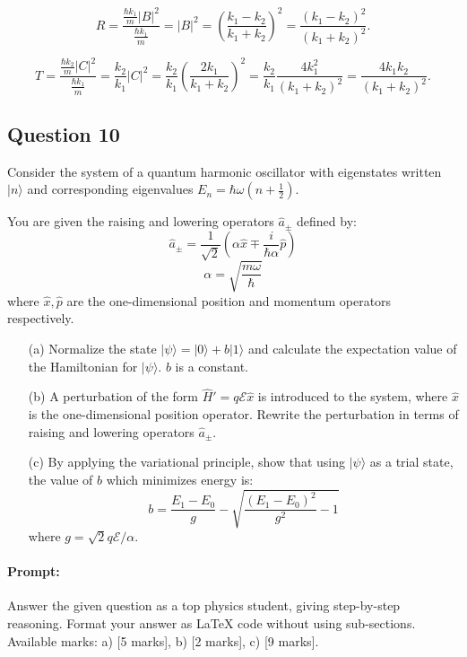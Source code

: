 \documentclass{article}
\begin{document}
\[
R = \frac{\frac{\hbar k_1}{m}|B|^2}{\frac{\hbar k_1}{m}} = |B|^2 = \left(\frac{k_1 - k_2}{k_1 + k_2}\right)^2 = \frac{(k_1 - k_2)^2}{(k_1 + k_2)^2}.
\]

\[
T = \frac{\frac{\hbar k_2}{m}|C|^2}{\frac{\hbar k_1}{m}} = \frac{k_2}{k_1}|C|^2 = \frac{k_2}{k_1}\left(\frac{2k_1}{k_1 + k_2}\right)^2 = \frac{k_2}{k_1}\frac{4k_1^2}{(k_1 + k_2)^2} = \frac{4k_1k_2}{(k_1 + k_2)^2}.
\]

\subsection{Question 10}

Consider the system of a quantum harmonic oscillator with eigenstates written \(|n\rangle\) and corresponding eigenvalues \(E_n = \hbar\omega(n + \frac{1}{2})\). 

You are given the raising and lowering operators \(\hat{a}_\pm\) defined by:
\[
\hat{a}_\pm = \frac{1}{\sqrt{2}} \left(\alpha \hat{x} \mp \frac{i}{\hbar \alpha} \hat{p}\right)
\]
\[
\alpha = \sqrt{\frac{m\omega}{\hbar}}
\]
where \(\hat{x}, \hat{p}\) are the one-dimensional position and momentum operators respectively.

\begin{enumerate}
    \item[(a)] Normalize the state \(|\psi\rangle = |0\rangle + b |1\rangle\) and calculate the expectation value of the Hamiltonian for \(|\psi\rangle\). \(b\) is a constant.
    
    \item[(b)] A perturbation of the form \(\hat{H}' = q \mathcal{E} \hat{x}\) is introduced to the system, where \(\hat{x}\) is the one-dimensional position operator. Rewrite the perturbation in terms of raising and lowering operators \(\hat{a}_\pm\).
    
    \item[(c)] By applying the variational principle, show that using \(|\psi\rangle\) as a trial state, the value of \(b\) which minimizes energy is:
    \[
    b = \frac{E_1 - E_0}{g} - \sqrt{\frac{(E_1 - E_0)^2}{g^2} - 1}
    \]
    where \(g = \sqrt{2}q\mathcal{E}/\alpha\).
\end{enumerate}


\paragraph{Prompt: \\} 
Answer the given question as a top physics student, giving step-by-step reasoning. Format your answer as LaTeX code without using sub-sections. Available marks: a) [5 marks], b) [2 marks], c) [9 marks].
\end{document}
